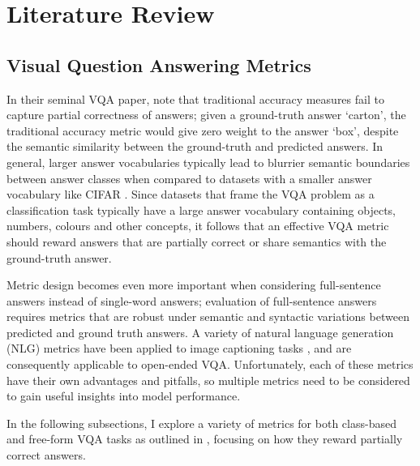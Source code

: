 \chapter{Literature Review}
\label{chapter:literature}



\section{Visual Question Answering Metrics}

In their seminal VQA paper, \citeauthor{malinowski2014multiworld} \cite{malinowski2014multiworld} note that traditional accuracy measures fail to capture partial correctness of answers; given a ground-truth answer `carton', the traditional accuracy metric would give zero weight to the answer `box', despite the semantic similarity between the ground-truth and predicted answers. In general, larger answer vocabularies typically lead to blurrier semantic boundaries between answer classes when compared to datasets with a smaller answer vocabulary like CIFAR \cite{krizhevsky2009learning}. Since datasets that frame the VQA problem as a classification task typically have a large answer vocabulary containing objects, numbers, colours and other concepts, it follows that an effective VQA metric should reward answers that are partially correct or share semantics with the ground-truth answer.

Metric design becomes even more important when considering full-sentence answers instead of single-word answers; evaluation of full-sentence answers requires metrics that are robust under semantic and syntactic variations between predicted and ground truth answers. A variety of natural language generation (NLG) metrics \cite{papineni2002bleu, lin2004rouge, banerjee2005meteor, vedantam2015cider} have been applied to image captioning tasks \cite{chen2015microsoft}, and are consequently applicable to open-ended VQA. Unfortunately, each of these metrics have their own advantages and pitfalls, so multiple metrics need to be considered to gain useful insights into model performance.


In the following subsections, I explore a variety of metrics for both class-based and free-form VQA tasks as outlined in \tableautorefname{ \ref{tab:vqa_metrics_suitability}}, focusing on how they reward partially correct answers.


